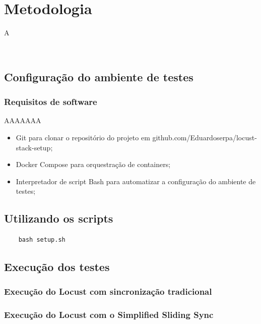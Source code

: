 \section{Metodologia}\label{sec:methodology}
A 

\

\subsection{Configuração do ambiente de testes}

\subsubsection{Requisitos de software}

AAAAAAA

\begin{itemize}
	\item Git para clonar o repositório do projeto em github.com/Eduardoserpa/locust-stack-setup;
	\item Docker Compose para orquestração de containers;
	\item Interpretador de script Bash para automatizar a configuração do ambiente de testes;
\end{itemize}

\subsection{Utilizando os scripts}

\begin{lstlisting}
	bash setup.sh
\end{lstlisting}

\subsection{Execução dos testes}

%

\subsubsection{Execução do Locust com sincronização tradicional}


\subsubsection{Execução do Locust com o Simplified Sliding Sync}

